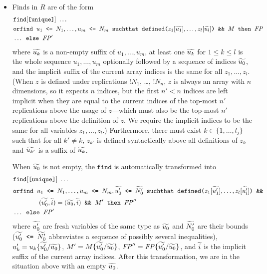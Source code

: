 \begin{itemize}
\begin{itemize}
\item %

Finds in $R$ are of the form
\[\begin{split}
&\texttt{find}[\texttt{[unique]}]\ \ldots\\
&\texttt{orfind }u_1 \texttt{ <= } N_1, \ldots, u_m \texttt{ <= }N_m
\texttt{ suchthat defined(}z_1[\widetilde{u_1}], \ldots, z_l[\widetilde{u_l}]\texttt{) \&\& }M\texttt{ then }\mathit{FP}\\
&\ldots \texttt{ else }\mathit{FP}'
\end{split}\]
where $\widetilde{u_k}$ is a non-empty
suffix of $u_1, \ldots, u_m$, at least one $\widetilde{u_k}$ for $1 \leq
k \leq l$ is the whole sequence $u_1, \ldots, u_m$ optionally followed by a sequence of indices $\widetilde{u_0}$,
and the implicit suffix of the current array indices is the same
for all $z_1, \ldots, z_l$.
%
(When $z$ is defined under replications $\texttt{!}N_1$, \ldots,
$\texttt{!}N_n$, $z$ is always an array with $n$ dimensions, so it
expects $n$ indices, but the first $n'<n$ indices are left implicit
when they are equal to the current indices of the top-most $n'$ replications
above the usage of $z$---which must also be the top-most $n'$
replications above the definition of $z$. We require the implicit
indices to be the same for all variables $z_1, \ldots, z_l$.)
Furthermore, there must exist $k \in \{ 1, \ldots, l_j\}$ such that
for all $k' \neq k$, $z_{k'}$ is defined syntactically above all
definitions of $z_k$ and $\widetilde{u_{k'}}$ is a suffix of $\widetilde{u_k}$.

When $\widetilde{u_0}$ is not empty, the $\texttt{find}$ is automatically
transformed into
\[\begin{split}
&\texttt{find}[\texttt{[unique]}]\ \ldots\\
&\texttt{orfind }u_1 \texttt{ <= } N_1, \ldots, u_m \texttt{ <= }N_m, \widetilde{u'_0}\texttt{ <= }\widetilde{N'_0}
\texttt{ suchthat defined(}z_1[\widetilde{u'_1}], \ldots, z_l[\widetilde{u'_l}]\texttt{) \&\&}\\
&\qquad\qquad (\widetilde{u'_0},\widetilde{i}) = (\widetilde{u_0},\widetilde{i})\texttt{ \&\& }M'\texttt{ then }\mathit{FP}''\\
&\ldots \texttt{ else }\mathit{FP}'
\end{split}\]
where $\widetilde{u'_0}$ are fresh variables of the same type as $\widetilde{u_0}$ and $\widetilde{N'_0}$ are their bounds
($\widetilde{u'_0}\texttt{ <= }\widetilde{N'_0}$ abbreviates a sequence of possibly several inequalities),
$u'_k = u_k \{\widetilde{u'_0}/\widetilde{u_0}\}$,
$M' = M\{\widetilde{u'_0}/\widetilde{u_0}\}$,
$\mathit{FP}'' = \mathit{FP}\{\widetilde{u'_0}/\widetilde{u_0}\}$,
and $\widetilde{i}$ is the implicit suffix of the current array indices.
After this transformation, we are in the situation above with an
empty $\widetilde{u_0}$.


\end{itemize}
\end{itemize}
